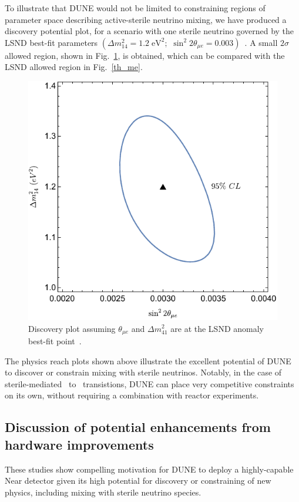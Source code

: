To illustrate that DUNE would not be limited to constraining regions of parameter space describing active-sterile neutrino mixing, we have produced a discovery potential plot, for a scenario with one sterile neutrino governed by the LSND best-fit parameters $\left(\Delta m_{14}^2= 1.2\;\text{eV}^2;\,\,\sin^2{2\theta_{\mu e}}=0.003\right)$~\cite{LSNDSterile}. A small $2\sigma$ allowed region, shown in Fig.~\ref{Dis_plot_me}, is obtained, which can be compared with the LSND allowed region in Fig.~\ref{th_me}. 
\begin{figure}[!h]
\centering
\includegraphics[scale=0.8]{graphics/dpme}
\caption{Discovery plot assuming $\theta_{\mu e}$ and $\Delta m_{41}^2$ are at the LSND anomaly best-fit point~\cite{LSNDSterile}.}
\label{Dis_plot_me}
\end{figure}

The physics reach plots shown above illustrate the excellent potential of DUNE to discover or constrain mixing with sterile neutrinos. Notably, in the case of sterile-mediated \numu~to \nue~transistions, DUNE can place very competitive constraints on its own, without requiring a combination with reactor experiments. 

\subsection{Discussion of potential enhancements from hardware improvements}
These studies show compelling motivation for DUNE to deploy a highly-capable Near detector given its high potential for discovery or constraining of new physics, including mixing with sterile neutrino species.



